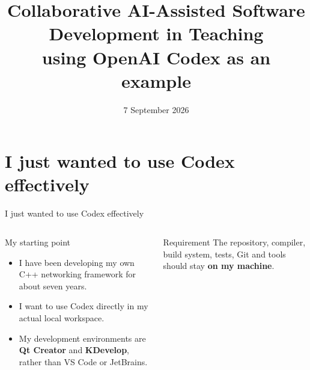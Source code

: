 \documentclass[\fhformat,10pt]{fh-ooe}
\title[DACHS 2026]{\Huge Collaborative AI-Assisted Software Development in Teaching\\[0.35em]\Large using OpenAI Codex as an example}
\institute[FH Upper Austria -- Hagenberg]{FH Upper Austria -- Campus Hagenberg\\Department of Digital Media}
\date[07.09.2026]{7 September 2026}
\newcommand{\CodexLink}{\href{https://github.com/openai/codex}{OpenAI Codex}}
\begin{document}

\section{I just wanted to use Codex effectively}
\begin{frame}{I just wanted to use Codex effectively}
\begin{columns}[T]
\centering
\vspace{0.75em}
\begin{block}{My starting point}
\begin{itemize}
  \item I have been developing my own C++ networking framework for about seven years.
  \item I want to use Codex directly in my actual local workspace.
  \item My development environments are \textbf{Qt Creator} and \textbf{KDevelop}, rather than VS Code or JetBrains.
\end{itemize}
\end{block}
\vspace{0.25em}
\begin{alertblock}{Requirement}
The repository, compiler, build system, tests, Git and tools should stay \textbf{on my machine}.
\end{alertblock}
\end{columns}
\end{frame}

\end{document}
